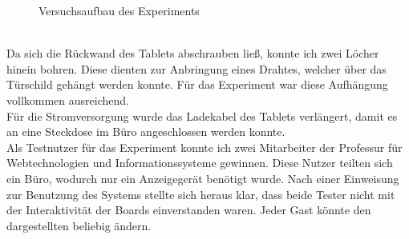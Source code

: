 \begin{figure}[h!]
  \centering
  \caption{Versuchsaufbau des Experiments}
  \label{img:Versuchsaufbau}
\end{figure}
\\
Da sich die Rückwand des Tablets abschrauben ließ, konnte ich zwei Löcher hinein bohren. Diese dienten zur Anbringung eines Drahtes, welcher über das Türschild gehängt werden konnte. Für das Experiment war diese Aufhängung vollkommen ausreichend.
\\
Für die Stromversorgung wurde das Ladekabel des Tablets verlängert, damit es an eine Steckdose im Büro angeschlossen werden konnte.
\\
Als Testnutzer für das Experiment konnte ich zwei Mitarbeiter der Professur für Webtechnologien und Informationssysteme gewinnen.
Diese Nutzer teilten sich ein Büro, wodurch nur ein Anzeigegerät benötigt wurde.
Nach einer Einweisung zur Benutzung des Systems stellte sich heraus klar, dass beide Tester nicht mit der Interaktivität der Boards einverstanden waren.
Jeder Gast könnte den dargestellten beliebig ändern.
